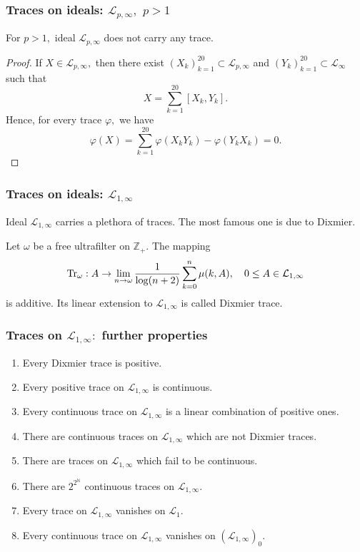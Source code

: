 \documentclass{beamer}
\theoremstyle{definition}
\begin{document}
\begin{frame}
\frametitle{Traces on ideals: $\mathcal{L}_{p,\infty},$ $p>1$}

\begin{example} For $p>1,$ ideal $\mathcal{L}_{p,\infty}$ does not carry any trace.
\end{example}
\begin{proof} If $X\in\mathcal{L}_{p,\infty},$ then there exist $(X_k)_{k=1}^{20}\subset\mathcal{L}_{p,\infty}$ and $(Y_k)_{k=1}^{20}\subset\mathcal{L}_{\infty}$ such that
$$X=\sum_{k=1}^{20}[X_k,Y_k].$$
Hence, for every trace $\varphi,$ we have
$$\varphi(X)=\sum_{k=1}^{20}\varphi(X_kY_k)-\varphi(Y_kX_k)=0.$$
\end{proof}
\end{frame}


\begin{frame}
\frametitle{Traces on ideals: $\mathcal{L}_{1,\infty}$}

Ideal $\mathcal{L}_{1,\infty}$ carries a plethora of traces. The most famous one is due to Dixmier.

\begin{definition} Let $\omega$ be a free ultrafilter on $\mathbb{Z}_+.$ The mapping
$${\rm Tr}_{\omega}:A\to\lim_{n\to\omega}\frac1{\log(n+2)}\sum_{k=0}^n\mu(k,A),\quad 0\leq A\in\mathcal{L}_{1,\infty}$$
is additive. Its linear extension to $\mathcal{L}_{1,\infty}$ is called Dixmier trace.
\end{definition}
\end{frame}

\begin{frame}
\frametitle{Traces on $\mathcal{L}_{1,\infty}:$ further properties}
\begin{enumerate}
\item Every Dixmier trace is positive.
\item Every positive trace on $\mathcal{L}_{1,\infty}$ is continuous.
\item Every continuous trace on $\mathcal{L}_{1,\infty}$ is a linear combination of positive ones.
\item There are continuous traces on $\mathcal{L}_{1,\infty}$ which are not Dixmier traces.
\item There are traces on $\mathcal{L}_{1,\infty}$ which fail to be continuous.
\item There are $2^{2^{\mathbb{N}}}$ continuous traces on $\mathcal{L}_{1,\infty}.$
\item Every trace on $\mathcal{L}_{1,\infty}$ vanishes on $\mathcal{L}_1.$
\item Every continuous trace on $\mathcal{L}_{1,\infty}$ vanishes on $(\mathcal{L}_{1,\infty})_0.$
\end{enumerate}
\end{frame}
\end{document}
